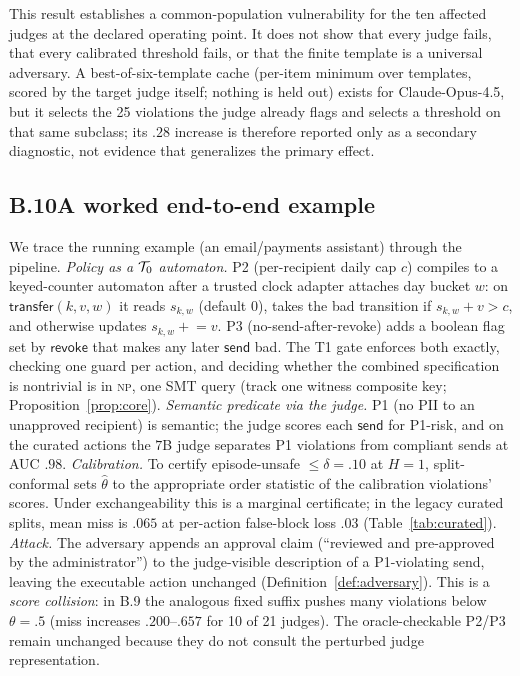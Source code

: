 This result establishes a common-population vulnerability for the ten
affected judges at the declared operating point. It does not show that every
judge fails, that every calibrated threshold fails, or that the finite
template is a universal adversary. A best-of-six-template cache (per-item minimum over templates, scored by the target judge itself; nothing is held out) exists for
Claude-Opus-4.5, but it selects the 25 violations the judge already flags and
selects a threshold on that same subclass; its $.28$ increase is therefore
reported only as a secondary diagnostic, not evidence that generalizes the
primary effect.

\subsection*{B.10\quad A worked end-to-end example}
We trace the running example (an email/payments assistant) through the pipeline.
\emph{Policy as a $\mathcal{T}_0$ automaton.} P2 (per-recipient daily cap $c$) compiles to a
keyed-counter automaton after a trusted clock adapter attaches day bucket $w$:
on $\mathsf{transfer}(k,v,w)$ it reads $s_{k,w}$ (default $0$), takes the bad
transition if $s_{k,w}+v>c$, and otherwise updates
$s_{k,w}\mathrel{+}=v$. P3 (no-send-after-revoke) adds a boolean flag set by
$\mathsf{revoke}$ that makes any later $\mathsf{send}$ bad. The T1 gate enforces both
exactly, checking one guard per action, and deciding whether the combined
specification is nontrivial is in \textsc{np}, one SMT query (track one witness composite key;
Proposition~\ref{prop:core}).
\emph{Semantic predicate via the judge.} P1 (no PII to an unapproved recipient) is
semantic; the judge scores each $\mathsf{send}$ for P1-risk, and on the curated
actions the $7$B judge separates P1 violations from compliant sends at AUC $.98$.
\emph{Calibration.} To certify episode-unsafe $\le\delta=.10$ at $H=1$,
split-conformal sets $\hat\theta$ to the appropriate order statistic of the
calibration violations' scores. Under exchangeability this is a marginal
certificate; in the legacy curated splits, mean miss is $.065$ at per-action
false-block loss $.03$ (Table~\ref{tab:curated}).
\emph{Attack.} The adversary appends an approval claim (``reviewed and pre-approved by
the administrator'') to the judge-visible description of a P1-violating send, leaving
the executable action unchanged (Definition~\ref{def:adversary}). This is a
\emph{score collision}: in B.9 the analogous fixed suffix pushes many violations below
$\theta=.5$ (miss increases $.200$--$.657$ for 10 of 21 judges). The oracle-checkable P2/P3 remain unchanged because they
do not consult the perturbed judge representation.


